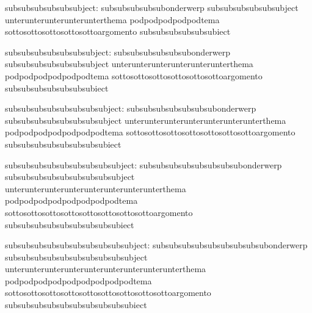             subsubsubsubsubsubject: subsubsubsubsubonderwerp                               subsubsubsubsubsubject
                                    unterunterunterunterunterthema                         podpodpodpodpodtema
                                    sottosottosottosottosottoargomento                     subsubsubsubsubsubiect

         subsubsubsubsubsubsubject: subsubsubsubsubsubonderwerp                            subsubsubsubsubsubsubject
                                    unterunterunterunterunterunterthema                    podpodpodpodpodpodtema
                                    sottosottosottosottosottosottoargomento                subsubsubsubsubsubsubiect

      subsubsubsubsubsubsubsubject: subsubsubsubsubsubsubonderwerp                         subsubsubsubsubsubsubsubject
                                    unterunterunterunterunterunterunterthema               podpodpodpodpodpodpodtema
                                    sottosottosottosottosottosottosottoargomento           subsubsubsubsubsubsubsubiect

   subsubsubsubsubsubsubsubsubject: subsubsubsubsubsubsubsubonderwerp                      subsubsubsubsubsubsubsubsubject
                                    unterunterunterunterunterunterunterunterthema          podpodpodpodpodpodpodpodtema
                                    sottosottosottosottosottosottosottosottoargomento      subsubsubsubsubsubsubsubsubiect

subsubsubsubsubsubsubsubsubsubject: subsubsubsubsubsubsubsubsubonderwerp                   subsubsubsubsubsubsubsubsubsubject
                                    unterunterunterunterunterunterunterunterunterthema     podpodpodpodpodpodpodpodpodtema
                                    sottosottosottosottosottosottosottosottosottoargomento subsubsubsubsubsubsubsubsubsubiect

\stopvariables






